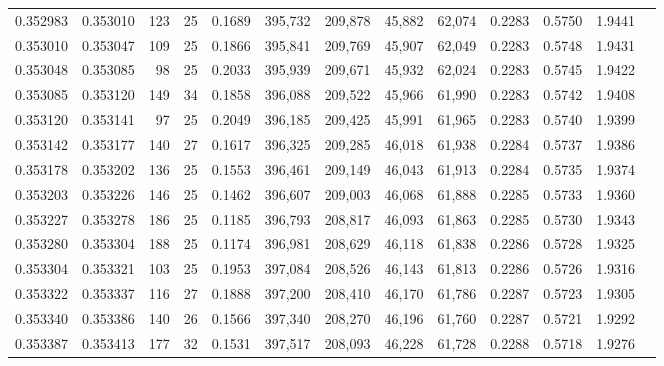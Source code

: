 \begin{tabular}{rrrrrrrrrrrrr}
0.352983 & 0.353010 &   123 &  25 &                                     0.1689 & 395,732 & 209,878 &  45,882 &  62,074 & 0.2283 & 0.5750 & 1.9441 \\
0.353010 & 0.353047 &   109 &  25 &                                     0.1866 & 395,841 & 209,769 &  45,907 &  62,049 & 0.2283 & 0.5748 & 1.9431 \\
0.353048 & 0.353085 &    98 &  25 &                                     0.2033 & 395,939 & 209,671 &  45,932 &  62,024 & 0.2283 & 0.5745 & 1.9422 \\
0.353085 & 0.353120 &   149 &  34 &                                     0.1858 & 396,088 & 209,522 &  45,966 &  61,990 & 0.2283 & 0.5742 & 1.9408 \\
0.353120 & 0.353141 &    97 &  25 &                                     0.2049 & 396,185 & 209,425 &  45,991 &  61,965 & 0.2283 & 0.5740 & 1.9399 \\
0.353142 & 0.353177 &   140 &  27 &                                     0.1617 & 396,325 & 209,285 &  46,018 &  61,938 & 0.2284 & 0.5737 & 1.9386 \\
0.353178 & 0.353202 &   136 &  25 &                                     0.1553 & 396,461 & 209,149 &  46,043 &  61,913 & 0.2284 & 0.5735 & 1.9374 \\
0.353203 & 0.353226 &   146 &  25 &                                     0.1462 & 396,607 & 209,003 &  46,068 &  61,888 & 0.2285 & 0.5733 & 1.9360 \\
0.353227 & 0.353278 &   186 &  25 &                                     0.1185 & 396,793 & 208,817 &  46,093 &  61,863 & 0.2285 & 0.5730 & 1.9343 \\
0.353280 & 0.353304 &   188 &  25 &                                     0.1174 & 396,981 & 208,629 &  46,118 &  61,838 & 0.2286 & 0.5728 & 1.9325 \\
0.353304 & 0.353321 &   103 &  25 &                                     0.1953 & 397,084 & 208,526 &  46,143 &  61,813 & 0.2286 & 0.5726 & 1.9316 \\
0.353322 & 0.353337 &   116 &  27 &                                     0.1888 & 397,200 & 208,410 &  46,170 &  61,786 & 0.2287 & 0.5723 & 1.9305 \\
0.353340 & 0.353386 &   140 &  26 &                                     0.1566 & 397,340 & 208,270 &  46,196 &  61,760 & 0.2287 & 0.5721 & 1.9292 \\
0.353387 & 0.353413 &   177 &  32 &                                     0.1531 & 397,517 & 208,093 &  46,228 &  61,728 & 0.2288 & 0.5718 & 1.9276 \\

\end{tabular}
